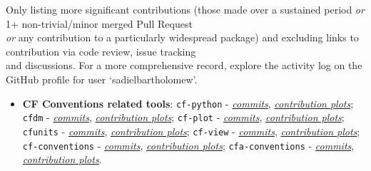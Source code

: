 
\hspace{2mm} Only listing more significant contributions (those made over a sustained period \textit{or} 1+ non-trivial/minor merged Pull Request\\\hspace*{3 mm}\textit{or} any contribution to a particularly widespread package) and excluding links to contribution via code review, issue tracking\\\hspace*{3 mm}and discussions. For a more comprehensive record, explore the activity log on the GitHub profile for user `sadielbartholomew'.

\begin{courses}
\course
	{
    \begin{itemize}

\item \textbf{CF Conventions related tools}:
    \texttt{cf-python} - \href{https://github.com/NCAS-CMS/cf-python/commits?author=sadielbartholomew}{\textit{commits}}, \href{https://github.com/NCAS-CMS/cf-python/graphs/contributors}{\textit{contribution plots}};
    \texttt{cfdm} - \href{https://github.com/NCAS-CMS/cfdm/commits?author=sadielbartholomew}{\textit{commits}}, \href{https://github.com/NCAS-CMS/cfdm/graphs/contributors}{\textit{contribution plots}};
    \texttt{cf-plot} - \href{https://github.com/NCAS-CMS/cf-plot/commits?author=sadielbartholomew}{\textit{commits}}, \href{https://github.com/NCAS-CMS/cf-plot/graphs/contributors}{\textit{contribution plots}};
    \texttt{cfunits} - \href{https://github.com/NCAS-CMS/cfunits/commits?author=sadielbartholomew}{\textit{commits}}, \href{https://github.com/NCAS-CMS/cfunits/graphs/contributors}{\textit{contribution plots}};
    \texttt{cf-view} - \href{https://github.com/NCAS-CMS/cf-view/commits?author=sadielbartholomew}{\textit{commits}}, \href{https://github.com/NCAS-CMS/cf-view/graphs/contributors}{\textit{contribution plots}};
    \texttt{cf-conventions} - \href{https://github.com/cf-convention/cf-conventions/commits?author=sadielbartholomew}{\textit{commits}}, \href{https://github.com/cf-convention/cf-conventions/graphs/contributors}{\textit{contribution plots}};
    \texttt{cfa-conventions} - \href{https://github.com/NCAS-CMS/cfa-conventions/commits?author=sadielbartholomew}{\textit{commits}}, \href{https://github.com/NCAS-CMS/cfa-conventions/graphs/contributors}{\textit{contribution plots}}.


\end{itemize}}
\end{courses}
